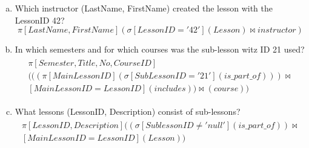 \documentclass{article}
\begin{document}
\printfront

\task{}

\begin{enumerate}[(a)]
\item
Which instructor (LastName, FirstName) created the lesson with the LessonID 42?
\begin{equation}
\pi\left[LastName,FirstName\right](\sigma\left[LessonID='42'\right](Lesson)\Join instructor)
\end{equation}

\item
In which semesters and for which courses was the sub-lesson witz ID 21 used?
\begin{align}
    \begin{split}
\pi\left[Semester, Title, No, CourseID\right]\\
(((\pi\left[MainLessonID\right](\sigma\left[SubLessonID = '21'\right](is\_part\_of)))\Join \\
\left[MainLessonID = LessonID\right](includes))\Join(course))
    \end{split}
\end{align}

\item
What lessons (LessonID, Description) consist of sub-lessons?
\begin{align}
    \begin{split}
\pi\left[LessonID,Description\right]((\sigma\left[SublessonID\neq'null'\right](is\_part\_of))\Join \\
\left[MainLessonID=LessonID\right](Lesson))
    \end{split}
\end{align}


\end{enumerate}
\end{document}
